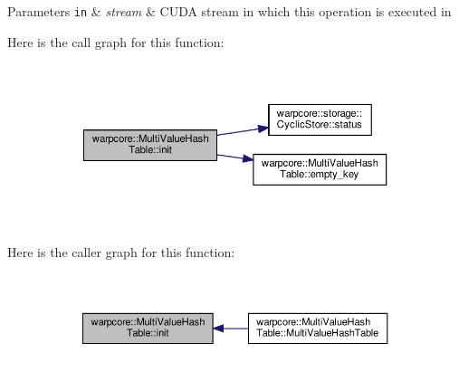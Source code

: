 \begin{DoxyParams}[1]{Parameters}
\mbox{\tt in}  & {\em stream} & C\+U\+DA stream in which this operation is executed in \\
\hline
\end{DoxyParams}
Here is the call graph for this function\+:
\nopagebreak
\begin{figure}[H]
\begin{center}
\leavevmode
\includegraphics[width=350pt]{classwarpcore_1_1MultiValueHashTable_ac12fa1b729821808ce4627c49bbc4d25_cgraph}
\end{center}
\end{figure}
Here is the caller graph for this function\+:
\nopagebreak
\begin{figure}[H]
\begin{center}
\leavevmode
\includegraphics[width=350pt]{classwarpcore_1_1MultiValueHashTable_ac12fa1b729821808ce4627c49bbc4d25_icgraph}
\end{center}
\end{figure}
\mbox{\label{classwarpcore_1_1MultiValueHashTable_a18aa96cecfd5b5cf0d65424a92784b07}} 
